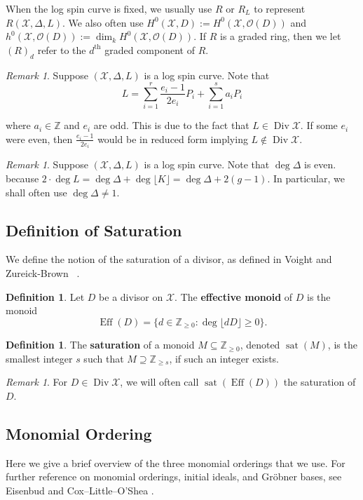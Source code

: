 \documentclass{amsart}
\theoremstyle{plain}
\theoremstyle{definition}
\newtheorem{defn}[thm]{Definition}
\theoremstyle{remark}
\newtheorem{rem}[thm]{Remark}
\numberwithin{equation}{section}
\newcommand\ssec{\subsection}
\newcommand\BZ{{\mathbb Z}}
\newcommand\sco{{\mathscr O}}
\DeclareMathOperator\di{Div}
\newcommand\sx{\mathscr X}
\newcommand \subhalf[1]{\frac{{#1} - 1}{2{#1}}}
\newcommand{\halfcan}{L}
\DeclareMathOperator{\Eff}{Eff}
\DeclareMathOperator{\sat}{sat}
\begin{document}
\noindent
When the log spin curve is fixed, we usually use $R$ or $R_\halfcan$ to
represent $R(\sx, \Delta, \halfcan)$. We also often use $H^0(\sx, D)
:= H^0(\sx, \sco(D))$ and $h^0(\sx, \sco(D)) := \dim_k H^0(\sx, \sco(D))$.
If $R$ is a graded ring, then we let $(R)_d$ refer to the $d^\text{th}$
graded component of $R$.

\begin{rem}
\label{rem:odd-denom}
Suppose $(\sx, \Delta, L)$ is a log spin curve. Note that
\[
	\halfcan = \sum_{i = 1}^{r} \subhalf{e_i} P_i + \sum_{i = 1}^{s} a_i P_i
\]

\noindent
where $a_i \in \BZ$ and $e_i$ are odd. This is due to the fact
that $\halfcan \in \di \sx$. If some $e_i$ were even,
then $\frac{e_i - 1}{2e_i}$ would be in reduced form implying $\halfcan \notin \di \sx$.
\end{rem}
	
\begin{rem}
\label{rem:delta-not-1}
Suppose $(\sx, \Delta, \halfcan)$ is a log spin curve. Note that $\deg \Delta$
is even. because $2 \cdot \deg \halfcan = \deg \Delta + \deg \lfloor K
\rfloor = \deg \Delta + 2(g-1).$
In particular, we shall often use $\deg \Delta \neq 1$.
\end{rem}

\ssec{Definition of Saturation}

We define the notion of the saturation of a divisor, as defined in
Voight and Zureick-Brown ~\cite[Section 7.2]{vzb:stacky}.

\begin{defn}
Let $D$ be a divisor on $\sx$. The \textbf{effective monoid} of $D$
is the monoid
\[
	\Eff(D) = \{d \in \BZ_{\geq 0} : \deg \lfloor dD \rfloor \geq 0 \}.
\]
\end{defn}

\begin{defn}
\label{defn:sat}
The \textbf{saturation} of a monoid $M \subseteq \BZ_{\geq 0}$,
denoted $\sat(M)$, is the smallest integer $s$ such that $M
\supseteq \BZ_{\geq s}$, if such an integer exists.
\end{defn}

\begin{rem}
For $D \in \di \sx$, we will often call $\sat(\Eff(D))$ the saturation of $D.$
\end{rem}

\ssec{Monomial Ordering}
\label{ssec:monomial-order}
Here we give a brief overview of the three monomial orderings
that we use. For further reference on monomial orderings,
initial ideals, and Gr\"{o}bner bases, see Eisenbud
\cite[Section 15.9]{eisenbud:comm-alg} and Cox--Little--O'Shea
\cite[Chapter 2]{cls:ideals-varieties-algorithms}.
\end{document}
